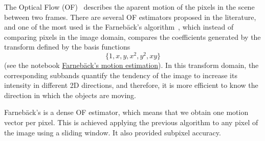 \begin{comment}
\begin{figure}
  \begin{tabular}{cccccc}
    \png{one}{200} & \png{x}{200} & \png{y}{200} & \png{x2}{200} & \png{y2}{200} & \png{xy}{200} \\
    No motion & Constant velocity in $X$ & Constant velocity in $Y$ & Constant acceleration in $X$ & Constant acceleration in $Y$ & Constant accelarion in diagonal
  \end{tabular}
  \caption{Correlation kernels (basis functions) used by the
    \emph{polynomial expansion} of the Farneb{\"a}ck's ME
    algorithm. See \href{https://github.com/Sistemas-Multimedia/Sistemas-Multimedia.github.io/blob/master/milestones/09-ME/farneback_ME.ipynb}{this}. The analized motion is depicted below the plot of each basis.}
  \label{fig:FarnebacK_basis}
\end{figure}
\end{comment}

The Optical Flow (OF)~\cite{horn1981determining} describes the aparent
motion of the pixels in the scene between two frames. There are
several OF estimators proposed in the literature, and one of the most
used is the Farneb{\"a}ck's algorithm~\cite{farneback2003two}, which
instead of comparing pixels in the image domain, compares the
coefficients generated by the transform defined by the basis functions
\begin{equation}
    \{1, x, y, x^2, y^2, xy\}
\end{equation}
(see the notebook
\href{https://github.com/vicente-gonzalez-ruiz/motion_estimation/blob/main/src/motion_estimation/farneback_ME.ipynb}{Farnebäck's
  motion estimation}). In this transform domain, the corresponding
subbands quantify the tendency of the image to increase its intensity
in different 2D directions, and therefore, it is more efficient to
know the direction in which the objects are moving.

Farneb{\"a}ck's is a dense OF estimator, which means that we obtain
one motion vector per pixel. This is achieved applying the previous
algorithm to any pixel of the image using a sliding window. It also
provided subpixel accuracy.



